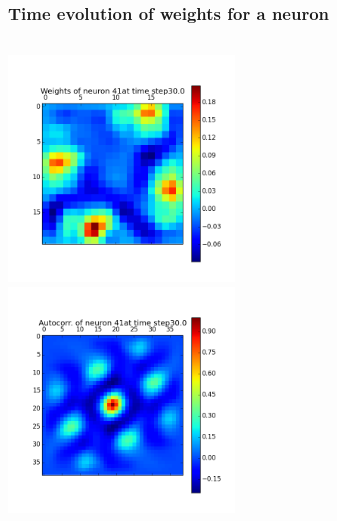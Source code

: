 \begin{frame}
\frametitle{Time evolution of weights for a neuron}
\begin{columns}[t]
\centering
\includegraphics[width=6cm,height=6cm]{neurons/neuron_w_41_t_30.png}\\
\centering
\includegraphics[width=6cm,height=6cm]{neurons/neuron_a_41_t_30.png}\\
\end{columns}
\end{frame}

